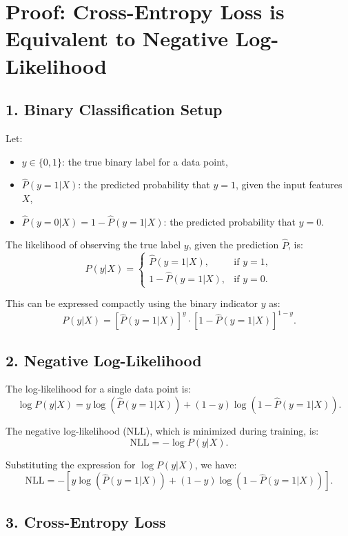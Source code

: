 \documentclass{article}
\begin{document}
\appendix

\section{Proof: Cross-Entropy Loss is Equivalent to Negative Log-Likelihood}

\subsection*{1. Binary Classification Setup}

Let:
\begin{itemize}
    \item \( y \in \{0, 1\} \): the true binary label for a data point,
    \item \( \hat{P}(y=1|X) \): the predicted probability that \( y=1 \), given the input features \( X \),
    \item \( \hat{P}(y=0|X) = 1 - \hat{P}(y=1|X) \): the predicted probability that \( y=0 \).
\end{itemize}

The likelihood of observing the true label \( y \), given the prediction \( \hat{P} \), is:
\[
P(y | X) = 
\begin{cases} 
\hat{P}(y=1|X), & \text{if } y = 1, \\
1 - \hat{P}(y=1|X), & \text{if } y = 0.
\end{cases}
\]

This can be expressed compactly using the binary indicator \( y \) as:
\[
P(y | X) = [\hat{P}(y=1|X)]^y \cdot [1 - \hat{P}(y=1|X)]^{1-y}.
\]

\subsection*{2. Negative Log-Likelihood}

The log-likelihood for a single data point is:
\[
\log P(y | X) = y \log(\hat{P}(y=1|X)) + (1-y) \log(1 - \hat{P}(y=1|X)).
\]

The negative log-likelihood (NLL), which is minimized during training, is:
\[
\text{NLL} = -\log P(y | X).
\]

Substituting the expression for \( \log P(y | X) \), we have:
\[
\text{NLL} = -\left[ y \log(\hat{P}(y=1|X)) + (1-y) \log(1 - \hat{P}(y=1|X)) \right].
\]

\subsection*{3. Cross-Entropy Loss}
\end{document}
